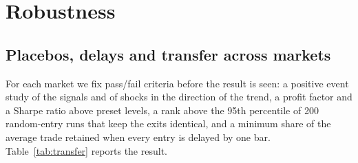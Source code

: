 \documentclass[11pt,a4paper]{article}
\newcommand{\1}{\mathbf{1}}
\begin{document}
\section{Robustness}\label{sec:robustness}

\subsection{Placebos, delays and transfer across markets}

For each market we fix pass/fail criteria before the result is seen: a positive event study of the signals and of shocks in the direction of the trend, a profit factor and a Sharpe ratio above preset levels, a rank above the 95th percentile of 200 random-entry runs that keep the exits identical, and a minimum share of the average trade retained when every entry is delayed by one bar. Table~\ref{tab:transfer} reports the result.
\end{document}
